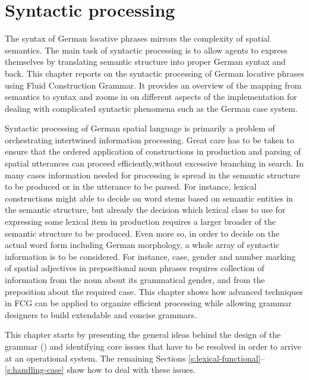 %

\chapter{Syntactic processing}
\label{s:german-locative-phrases-syntax}
The syntax of German locative phrases mirrors the complexity of 
spatial semantics. The main task of syntactic processing is to 
allow agents to express themselves by translating semantic structure into 
proper German syntax and back. This chapter reports on the syntactic 
processing of German locative phrases using Fluid Construction Grammar. 
It provides an overview of the mapping from semantics to syntax and 
zooms in on different aspects of the implementation for dealing with complicated
syntactic phenomena such as the German case system.

Syntactic processing of German spatial language is primarily a problem
of orchestrating intertwined information processing. Great care
has to be taken to ensure that the ordered application of constructions 
in production and parsing of spatial utterances can proceed efficiently,without 
excessive branching in search. In many cases information
needed for processing is spread in the semantic structure to 
be produced or in the utterance to be parsed. For instance, 
lexical constructions might able to decide on word stems based
on semantic entities in the semantic structure, but already 
the decision which lexical class to use for expressing some lexical item 
in production requires a larger broader of the semantic
structure to be produced. Even more so, in order to decide on the actual
word form including German morphology, a whole array of syntactic information 
is to be considered. For instance, case, gender and number marking 
of spatial adjectives in prepositional noun phrases requires collection of  
information from the noun about its grammatical gender, and from 
the preposition about the required 
case. This chapter shows how advanced techniques
in FCG can be applied to organize efficient processing while 
allowing grammar designers to build extendable and concise grammars.

This chapter starts by presenting the general ideas behind the design of 
the grammar () and
identifying core issues that have to be resolved in order to arrive at an
operational system. The remaining Sections \ref{s:lexical-functional}--\ref{s:handling-case} show how to deal with these issues.

